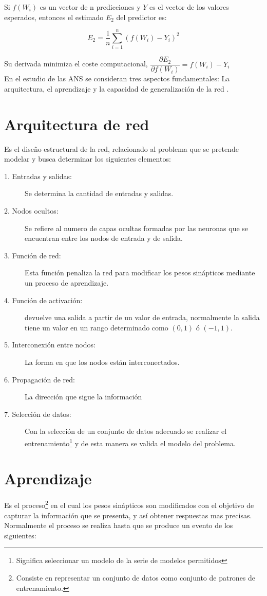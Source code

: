 \documentclass[11pt,titlepage]{report}
\begin{document}
Si $f(W_i)$ es un vector de n predicciones y $Y$ es el vector de los valores esperados, entonces el estimado $E_2$ del predictor es: \cite{Int08}

\[E_2 =\frac{1}{n}\sum_{i=1}^{n}(f(W_i)-Y_{i})^{2}\]

Su derivada minimiza el coste computacional, $ \dfrac{\partial E_2}{\partial f(W_i)} = f(W_i) - Y_i $\\
 

En el estudio de las ANS se consideran tres aspectos fundamentales: La arquitectura, el aprendizaje y la capacidad de generalización de la red \cite{Lib04}.


\section{Arquitectura de red}
Es el diseño estructural de la red, relacionado al problema que se pretende modelar y busca determinar los siguientes elementos: \label{08}
\begin{description}
	\item[1. Entradas y salidas:] Se determina la cantidad de entradas y salidas.
	 
	\item[2. Nodos ocultos:] Se refiere al numero de capas ocultas formadas por las neuronas que se encuentran entre los nodos de entrada y de salida.  
	\item[3. Función de red:]  Esta función penaliza la red para modificar los pesos sinápticos mediante un proceso de aprendizaje. 
	 
	\item[4. Función de activación:] devuelve una salida a partir de un valor de entrada, normalmente la salida tiene un valor en un rango determinado como $(0,1)$ ó $(-1,1)$.
	
	\item[5. Interconexión entre nodos:] La forma en que los nodos están interconectados.
	\item[6. Propagación de red:] La dirección que sigue la información 
	\item[7. Selección de datos:] Con la selección de un conjunto de datos adecuado se realizar el entrenamiento\footnote{Significa seleccionar un modelo de la serie de modelos permitidos}  y de esta manera se valida el modelo del problema.
\end{description}

\section{Aprendizaje}
Es el proceso\footnote{Consiste en representar un conjunto de datos como conjunto de patrones de entrenamiento.} en el cual los pesos sinápticos son modificados con el objetivo de capturar la información que se presenta, y así obtener respuestas mas precisas. Normalmente el proceso se realiza hasta que se produce un evento de los siguientes:
\end{document}

